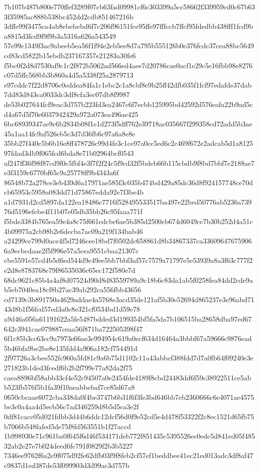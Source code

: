 \documentclass[11pt,a4paper]{article}
\begin{document}
{7b107b487b800e770ffef3289f07cb63fad09981cf6c303399a5cc58662f339959cd0c67b633f35985ac888b538bc452dd2cdb851467216b
3dffe99f3475ca4ab8ebebebd6f7c206f96151fce95ffe97fffccb7ffcf95fdedbb438fff1fcd9ba8815d3fcd9f9f9b3a5316a626a543549
57e99c1349f3ac9abeeb5ea56f1f94e2eb5ee8d7a795b555126b0e376fcdc37cea88bc5649cd83cd5822b15ebdb237167357e21283a30fe6
f5bc0f2d8d7530af9c1c2f872b5062ad566ed4aee7d20786cae0acf1e29c5e16fbb98e8276c07d5ffc568bb3b860a4d5a5338f25a2879713
e97cddc7f22d8706c0eddea84fa1c1ebc2c1a8cbf8e9b25ff42dfb035f1fcf97edafde37dab7dd83d843ca0033dc3df8cfa3ec07db8f9987
de53b027644fcf9eac3d757b223fd3ea2467c6f7ecbb125995bd42592d576eafa22b9ad5cd4a67d5f70e6037942429a972a073ea496ae425
6bc68939347ae9c6b2834b08f1e1d273f5dff762e39718ac035667f299358cd72add5b3ae45a1aa14fc9af526eb5c3d7d36fb6c97a6a8e8e
35bb27f440c5b6b16e8ff478726c99d4fe3c1ce97a0cc5ed6c2c469f672e2adcab5d1a812597fdad3db9f065fcd6bda8e71b02964bcf0543
af247ff36f98f87cd9f0c5fbf4e3f7f2f24c5f9cd32f5bdeb66b115cbdb9f8bd7bbf7e2188ae7e3f3159c6770bf65c9a25778ff9b4343a6f
86548b72a278ce3eb439d6a17971ae585f3c035b474bd429a85dc36d8f924157748ce70dcb65953c5958a083dd71d75867edda92e7f3be4b
a1d7931d2cd5897da122ea18486c7716f528495533517ba497e22bed50776ab5236a73976d5196efebe4f11b07e05db35bb26c95faaa771f
f5bde3384b765ea59e4a8c75f661edcbc6ae5b385d2500eb674d6049cc7b30b252d4a51c4b09975a2cb98b2e6decba7ac09a219f134bab46
a24299ce799d0ace4f5d7246cee18bd7f0502dc658861d8b34867337ca336096476759066a9ecbcdaae2f5f996e57a5cea9551cbaa21307c
cbe5591e57cd4b5d6ed544d9e49ee5bb7bbf3af57c7579a71797e5e53939a8a3f63c777f2e2d8e8783768e79f86535036c65ec172f580e7d
68dc9621c85b4a4af8d07524d90d8d83559789a9c18b6c83da1ab5f0258fea84dd2cde9ab5eb7040ea18cf8b27ac39ab292ca556fbb43656
cd7139c3b891750a4629addae4a5768e3acd35de121af5b30e52694d865237e3e96abd7143d8b1f56fcd57ed3a0c8e321cf0534bd1d59e78
a9d46a056a61191622a5fe5487bdded3d199354bf5fa5da7b106515ba28658dba97ed67642c3941cae079887ceaa56f871ba722505398f47
6f1c85b3cc63cc9a7973e66ae3e994954c619a0ecf634d16464a3bbbf67a59666c9876ead5b46bfa9be2be8e135fdd4a906a182cf754491d
2f97726a3cbee552fc960a5fd81c9a6b75d1102c11a43abbcf388fdd7d7a0fb64f09240e3e271823b1ded3fcedf6b2b2f799e77a82da2f75
caea8896bf58abb33cf4e52c94507a0e2454fde4189f8cbd24483dd6f59c38922511ce5abb523fb576f5b1fa39f10aeabbebaf7ce85d67a8
0650cbcaae6072cba338da0f4be3747b6b31f6f3fe3bd646bb7eb2360666c6e4071ae4575be3c0a4aa4d5ecb56c7ad346259d8b5d5ca3e2f
0df81cacc05d021fdbb3d44b6ddc12dcf56d0f9e52cd5e4d478f53322f2c8ec1521d65fb75b7066b548fafed5de75f8fd563551b1f27accd
1b998930e71c961ba0f645f6d46f534171deb772f851435c5395526ec0edc5d841ed05f48532ab2e27e7b024deed6fc791f0829f2b3b5227
7346ee9762f6a2e9f075d92fe62dfb03f9f8feb2cf57ef1beddbee41ec21ed013adc3df8af47c9837d1ed387de53f099903d3d99ac3d757b
}
\end{document}
